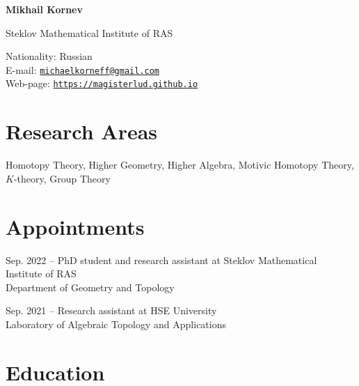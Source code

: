 \documentclass[11pt,letterpaper]{report}
\newcommand{\myname}{Mikhail Kornev}
\newcommand{\namefont}[1]{{\normalfont\bfseries\Huge{#1}}}
\begin{document}
    \raggedright{}

    \namefont{\myname}

    \vspace{1em}
    \begin{minipage}[t]{2.5in}
        Steklov Mathematical Institute of RAS 
    \end{minipage}
    \hfill
    \begin{minipage}[t]{3in}
        Nationality: Russian\\
        E-mail: \href{mailto:michaelkorneff@gmail.com}{\tt michaelkorneff@gmail.com}\\
        Web-page: \href{https://magisterlud.github.io}{\tt https://magisterlud.github.io}
    \end{minipage}
    
    \section*{Research Areas}

    Homotopy Theory, Higher Geometry, Higher Algebra, Motivic Homotopy Theory, $K$-theory, Group Theory    
    
    
    
     \section*{Appointments}

    \begin{tablist}

        \item[Sep. 2022 --]   \tab{}PhD student and research assistant at Steklov Mathematical Institute of RAS  \\
                              Department of Geometry and Topology

        \item[Sep. 2021 --]  \tab{}Research assistant at HSE University \\
                              Laboratory of Algebraic Topology and Applications

    \end{tablist}




    \section*{Education}
\end{document}

